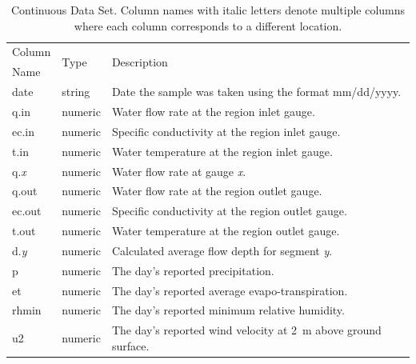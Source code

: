 \begin{table}[htbp]
	\centering
	\caption[Continuous Data Set.]{Continuous Data Set.  Column names with italic letters denote multiple columns where each column corresponds to a different location. }
	\label{tab:continuousData}
	\begin{tabular}{l  l  l}
		\toprule
		Column & \multirow{2}{*}{Type}  & \multirow{2}{*}{Description}\\
		Name
		\\ \toprule
		date & string & Date the sample was taken using the format mm/dd/yyyy. \\
		q.in & numeric & Water flow rate at the region inlet gauge. \\
		ec.in & numeric & Specific conductivity at the region inlet gauge. \\
		t.in & numeric & Water temperature at the region inlet gauge. \\
		q.\textit{x} & numeric & Water flow rate at gauge \textit{x}. \\
		q.out & numeric & Water flow rate at the region outlet gauge. \\
		ec.out & numeric & Specific conductivity at the region outlet gauge. \\
		t.out & numeric & Water temperature at the region outlet gauge. \\
		d.\textit{y} & numeric & Calculated average flow depth for segment \textit{y}. \\
		p & numeric & The day's reported precipitation. \\
		et & numeric & The day's reported average evapo-transpiration. \\
		rhmin & numeric & The day's reported minimum relative humidity. \\
		u2 & numeric & The day's reported wind velocity at \SI{2}{\meter} above ground surface. 
		\\ \bottomrule
	\end{tabular}
\end{table}

